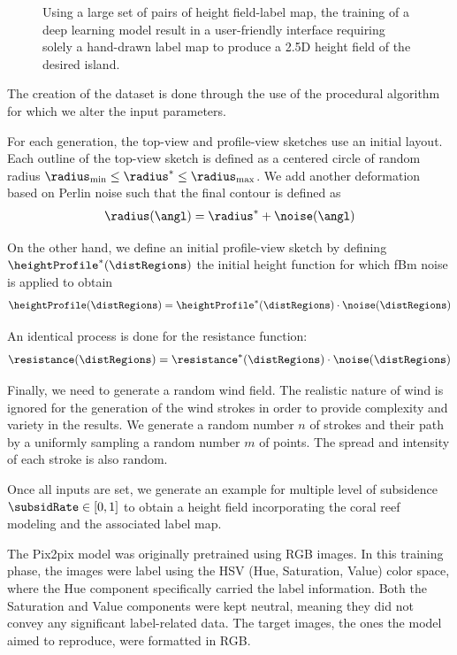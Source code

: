 \begin{figure}[H]
	\centering
    \caption{Using a large set of pairs of height field-label map, the training of a deep learning model result in a user-friendly interface requiring solely a hand-drawn label map to produce a 2.5D height field of the desired island.}
    \label{fig:coral-island_cGAN-pipeline}
\end{figure}


The creation of the dataset is done through the use of the procedural algorithm for which we alter the input parameters. 

For each generation, the top-view and profile-view sketches use an initial layout. Each outline of the top-view sketch is defined as a centered circle of random radius $\radius_\text{min} \leq \radius^* \leq \radius_\text{max}$. We add another deformation based on Perlin noise such that the final contour is defined as 
\begin{align}
    \radius(\angl) = \radius^* + \noise(\angl)
\end{align}

On the other hand, we define an initial profile-view sketch by defining $\heightProfile^*(\distRegions)$ the initial height function for which fBm noise is applied to obtain 
\begin{align}
    \heightProfile(\distRegions) = \heightProfile^*(\distRegions) \cdot \noise(\distRegions)
\end{align}

An identical process is done for the resistance function:
\begin{align}
    \resistance(\distRegions) = \resistance^*(\distRegions) \cdot \noise(\distRegions)
\end{align}

Finally, we need to generate a random wind field. The realistic nature of wind is ignored for the generation of the wind strokes in order to provide complexity and variety in the results. 
We generate a random number $n$ of strokes and their path by a uniformly sampling a random number $m$ of points. The spread and intensity of each stroke is also random.

Once all inputs are set, we generate an example for multiple level of subsidence $\subsidRate \in [0, 1]$ to obtain a height field incorporating the coral reef modeling and the associated label map. 

The Pix2pix model was originally pretrained using RGB images. In this training phase, the images were label using the HSV (Hue, Saturation, Value) color space, where the Hue component specifically carried the label information. Both the Saturation and Value components were kept neutral, meaning they did not convey any significant label-related data. The target images, the ones the model aimed to reproduce, were formatted in RGB.

